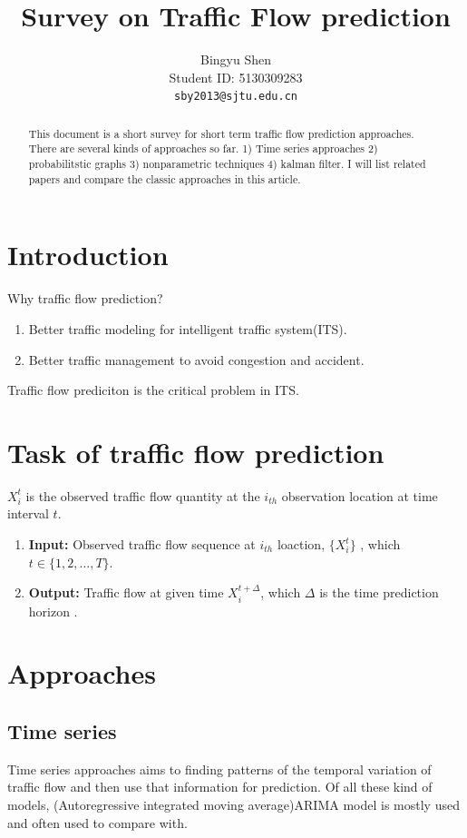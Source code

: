 \documentclass[11pt]{article}
\title{Survey on Traffic Flow prediction}
\author{Bingyu Shen \\
  Student ID: 5130309283\\
    {\tt sby2013@sjtu.edu.cn}
}
\date{}
\begin{document}
\maketitle
\begin{abstract}
  This document is a short survey for short term traffic flow prediction approaches. There are several kinds of approaches so far. 1) Time series approaches 2) probabilitstic graphs 3) nonparametric techniques 4) kalman filter. I will list related papers and compare the classic approaches in this article.
\end{abstract}

\section{Introduction}
Why traffic flow prediction?
\begin{enumerate}
	\item Better traffic modeling for intelligent traffic system(ITS).
	\item Better traffic management to avoid congestion and accident.
\end{enumerate}

Traffic flow prediciton is the critical problem in ITS.
\section{Task of traffic flow prediction}
$X_i^t$ is the observed traffic flow quantity at the $i_{th}$ observation location at time interval $t$.
\begin{enumerate}
	\item \textbf{Input:} Observed traffic flow sequence at $i_{th}$ loaction, $\{X_i^t\}$ , which $t \in \{1,2,\dots, T\} $.
	
	\item \textbf{Output:} Traffic flow at given time $X_i^{t+\Delta}$, which $\Delta$ is the time prediction horizon . 
\end{enumerate}


\section{Approaches}
\subsection{Time series}
Time series approaches aims to finding patterns of the temporal variation of traffic flow and then use that information for prediction. Of all these kind of models, (Autoregressive integrated moving average)ARIMA model is mostly used and often used to compare with.
\end{document}

